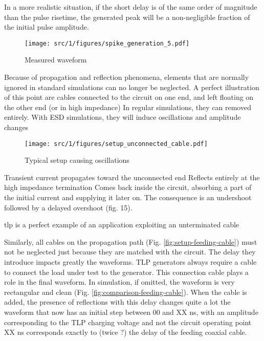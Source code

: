 In a more realistic situation, if the short delay is of the same order of magnitude than the pulse risetime, the generated peak will be a non-negligible fraction of the initial pulse amplitude.

\begin{figure}[!h]
  \centering
  \texttt{[image: src/1/figures/spike\_generation\_5.pdf]}
  \caption{Measured waveform}
  \label{fig:spike-step-4}
\end{figure}

Because of propagation and reflection phenomena, elements that are normally ignored in standard simulations can no longer be neglected.
A perfect illustration of this point are cables connected to the circuit on one end, and left floating on the other end (or in high impedance)
In regular simulations, they can removed entirely.
With ESD simulations, they will induce oscillations and amplitude changes

\begin{figure}[!h]
  \centering
  \texttt{[image: src/1/figures/setup\_unconnected\_cable.pdf]}
  \caption{Typical setup causing oscillations}
  \label{fig:setup-unconnected-cable}
\end{figure}

Transient current propagates toward the unconnected end
Reflects entirely at the high impedance termination
Comes back inside the circuit, absorbing a part of the initial current and supplying it later on.
The consequence is an undershoot followed by a delayed overshoot (fig. 15).

\gls{tlp} is a perfect example of an application exploiting an unterminated cable

Similarly, all cables on the propagation path (Fig. \ref{fig:setup-feeding-cable}) must not be neglected just because they are matched with the circuit.
The delay they introduce impacts greatly the waveforms.
TLP generators always require a cable to connect the load under test to the generator.
This connection cable plays a role in the final waveform.
In simulation, if omitted, the waveform is very rectangular and clean (Fig. \ref{fig:comparison-feeding-cable}).
When the cable is added, the presence of reflections with this delay changes quite a lot the waveform that now has an initial step between 00 and XX ns, with an amplitude corresponding to the TLP charging voltage and not the circuit operating point
XX ns corresponds exactly to (twice ?) the delay of the feeding coaxial cable.

